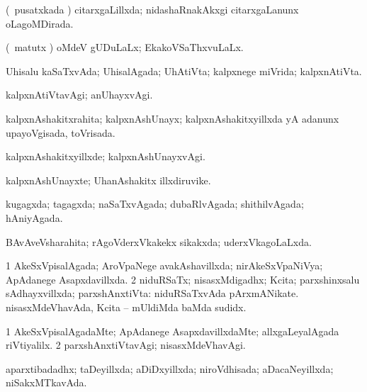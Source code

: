 {{\bentry
{} 
\gl{\gu}
\expl{}
\bmng
(\kanmu\ pusatxkada \vi) citarxgaLillxda; nidashaRnakAkxgi citarxgaLanunx oLagoMDirada. 
\emng
\eentry

\bentry
{} 
\gl{\gu}
\expl{}
\bmng
(\savi\ matutx \pArxvi) oMdeV gUDuLaLx; EkakoVSaThxvuLaLx. 
\emng
\eentry

\bentry
{} 
\gl{\gu}
\expl{}
\bmng
Uhisalu kaSaTxvAda; UhisalAgada; UhAtiVta; kalpxnege miVrida; kalpxnAtiVta. 
\emng
\eentry

\bentry
{} 
\gl{\kirxvi}
\expl{}
\bmng
kalpxnAtiVtavAgi; anUhayxvAgi. 
\emng
\eentry

\bentry
{} 
\gl{\gu}
\expl{}
\bmng
kalpxnAshakitxrahita; kalpxnAshUnayx; kalpxnAshakitxyillxda yA adanunx upayoVgisada, toVrisada. 
\emng
\eentry

\bentry
{} 
\gl{\kirxvi}
\expl{}
\bmng
kalpxnAshakitxyillxde; kalpxnAshUnayxvAgi. 
\emng
\eentry

\bentry
{} 
\gl{\nA}
\expl{}
\bmng
kalpxnAshUnayxte; UhanAshakitx illxdiruvike. 
\emng
\eentry

\bentry
{} 
\gl{\gu}
\expl{}
\bmng
kugagxda; tagagxda; naSaTxvAgada; dubaRlvAgada; shithilvAgada; hAniyAgada. 
\emng
\eentry

\bentry
{} 
\gl{\gu}
\expl{}
\bmng
BAvAveVsharahita; rAgoVderxVkakekx sikakxda; uderxVkagoLaLxda. 
\emng
\eentry

\bentry
{} 
\gl{\gu}
\expl{}
\bmng
\bnum
\num{1} AkeSxVpisalAgada; AroVpaNege avakAshavillxda; nirAkeSxVpaNiVya; ApAdanege Asapxdavillxda. 
\num{2} niduRSaTx; nisasxMdigadhx; Kcita; parxshinxsalu sAdhayxvillxda; parxshAnxtiVta:  niduRSaTxvAda pArxmANikate.  nisasxMdeVhavAda, Kcita -- mUldiMda baMda sudidx. 
\enum
\emng
\eentry

\bentry
{} 
\gl{\kirxvi}
\expl{}
\bmng
\bnum
\num{1} AkeSxVpisalAgadaMte; ApAdanege AsapxdavillxdaMte; allxgaLeyalAgada riVtiyalilx. 
\num{2} parxshAnxtiVtavAgi; nisasxMdeVhavAgi. 
\enum
\emng
\eentry

\bentry
{} 
\gl{\gu}
\expl{}
\bmng
aparxtibadadhx; taDeyillxda; aDiDxyillxda; niroVdhisada; aDacaNeyillxda; niSakxMTkavAda. 
\emng
\eentry

}}
